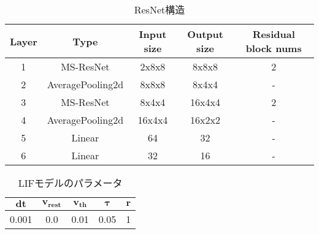 \begin{table}[htb]
    \centering
    \caption{ResNet構造}
    \label{tab:model:parameter:resnet}
    \begin{tabular}{ccccc}
        \hline
        \textbf{Layer}& \textbf{Type}&\textbf{Input size} & \textbf{Output size} & \textbf{Residual block nums}\\
        \hline
        1   & MS-ResNet & 2x8x8 & 8x8x8 & 2\\
        2 & AveragePooling2d & 8x8x8 & 8x4x4 & - \\
        3 & MS-ResNet & 8x4x4 & 16x4x4 & 2\\
        4 & AveragePooling2d & 16x4x4 & 16x2x2 & - \\
        5 & Linear & 64 & 32 & - \\
        6 & Linear & 32 & 16 & - \\
        \hline
    \end{tabular}
\end{table}


\begin{table}[htb]
    \centering
    \caption{LIFモデルのパラメータ}
    \label{tab:model:parameter:lif}
    \begin{tabular}{ccccc}
        \hline
        $\bm{dt}$& $\bm{v_{rest}}$ & $\bm{v_{th}}$ & $\bm{\tau}$ & $\bm{r}$\\
        \hline
        0.001   & 0.0 & 0.01 & 0.05 & 1 \\
        \hline
    \end{tabular}
\end{table}
